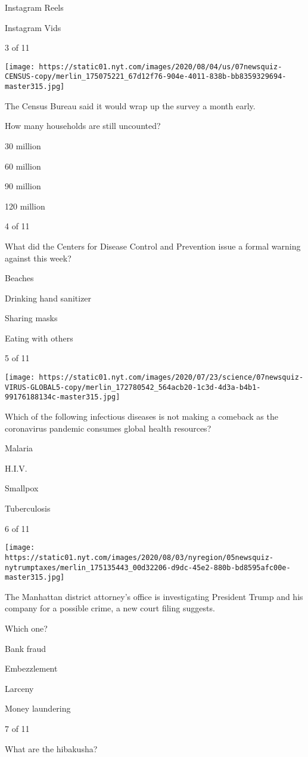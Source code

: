 Instagram Reels

Instagram Vids

3 of 11

\texttt{[image: https://static01.nyt.com/images/2020/08/04/us/07newsquiz-CENSUS-copy/merlin\_175075221\_67d12f76-904e-4011-838b-bb8359329694-master315.jpg]}

The Census Bureau said it would wrap up the survey a month early.

How many households are still uncounted?

30 million

60 million

90 million

120 million

4 of 11

What did the Centers for Disease Control and Prevention issue a formal
warning against this week?

Beaches

Drinking hand sanitizer

Sharing masks

Eating with others

5 of 11

\texttt{[image: https://static01.nyt.com/images/2020/07/23/science/07newsquiz-VIRUS-GLOBAL5-copy/merlin\_172780542\_564acb20-1c3d-4d3a-b4b1-99176188134c-master315.jpg]}

Which of the following infectious diseases is not making a comeback as
the coronavirus pandemic consumes global health resources?

Malaria

H.I.V.

Smallpox

Tuberculosis

6 of 11

\texttt{[image: https://static01.nyt.com/images/2020/08/03/nyregion/05newsquiz-nytrumptaxes/merlin\_175135443\_00d32206-d9dc-45e2-880b-bd8595afc00e-master315.jpg]}

The Manhattan district attorney's office is investigating President
Trump and his company for a possible crime, a new court filing suggests.

Which one?

Bank fraud

Embezzlement

Larceny

Money laundering

7 of 11

What are the hibakusha?

